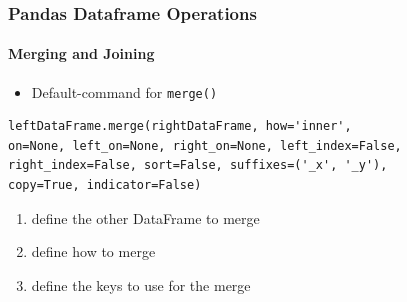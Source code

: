 \documentclass[12pt,ngerman]{beamer}
\begin{document}
\begin{frame}[fragile]
\frametitle{Pandas Dataframe Operations}
\framesubtitle{Merging and Joining}

\begin{itemize}
	\item Default-command for \texttt{merge()}
\end{itemize}

\begin{lstlisting}
leftDataFrame.merge(rightDataFrame, how='inner', 
on=None, left_on=None, right_on=None, left_index=False, 
right_index=False, sort=False, suffixes=('_x', '_y'), 
copy=True, indicator=False)
\end{lstlisting}

\begin{enumerate}
\item define the other DataFrame to merge
\item define how to merge
\item define the keys to use for the merge
\end{enumerate}



\end{frame}
\end{document}
